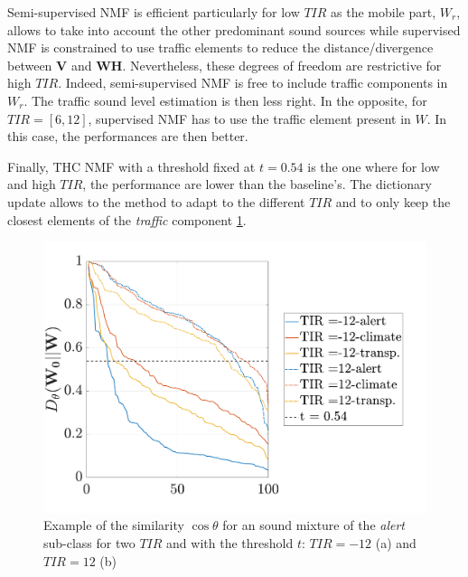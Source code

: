 \documentclass[twocolumn,a4paper,10pt]{article}
\begin{document}
Semi-supervised NMF is efficient particularly for low $TIR$ as the mobile part, $W_r$, allows to take into account the other predominant sound sources while supervised NMF is constrained to use traffic elements to reduce the distance/divergence between $\mathbf{V}$ and $\mathbf{WH}$. Nevertheless, these degrees of freedom are restrictive for high $TIR$. Indeed, semi-supervised NMF is free to include traffic components in $W_r$. The traffic sound level estimation is then less right. In the opposite, for $TIR = [6 , 12]$, supervised NMF has to use the traffic element present in $W$. In this case, the performances are then better. 

Finally, THC NMF with a threshold fixed at $t = 0.54$ is the one where for low and high $TIR$, the performance are lower than the baseline's. The dictionary update allows to the method to adapt to the different $TIR$ and to only keep the closest elements of the \textit{traffic} component \ref{fig:dist_-12_12}.

\begin{figure}
    \centering
    \includegraphics[width=\linewidth]{../image/dist_-12_12.pdf}    
    \caption{Example of the similarity $\cos \theta$ for an sound mixture of the \textit{alert} sub-class for two $TIR$ and with the threshold $t$: $TIR = -12$ (a) and $TIR = 12$ (b)}
    \label{fig:dist_-12_12}
\end{figure}
\end{document}
